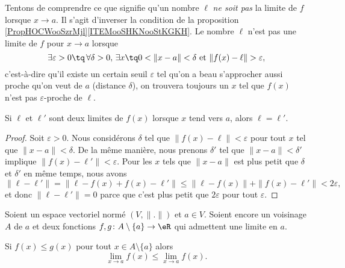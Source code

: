 Tentons de comprendre ce que signifie qu'un nombre $\ell$ \emph{ne soit pas} la limite de $f$ lorsque $x\to a$. Il s'agit d'inverser la condition de la proposition \ref{PropHOCWooSzrMjl}\ref{ITEMooSHKNooStKGKH}. Le nombre $\ell$ n'est pas une limite de $f$ pour $x\to a$ lorsque
\begin{equation}		\label{EqCaractNonLim}
	\exists\varepsilon>0\tq\,\forall\delta>0,\,\exists x\tq 0<\| x-a \|<\delta\text{ et }\| f(x)-\ell \|>\varepsilon,
\end{equation}
c'est-à-dire qu'il existe un certain seuil $\varepsilon$ tel qu'on a beau s'approcher aussi proche qu'on veut de $a$ (distance $\delta$), on trouvera toujours un $x$ tel que $f(x)$ n'est pas $\varepsilon$-proche de $\ell$.

\begin{lemma}
	Si $\ell$ et $\ell'$ sont deux limites de $f(x)$ lorsque $x$ tend vers $a$, alors $\ell=\ell'$.
\end{lemma}

\begin{proof}
	Soit $\varepsilon>0$. Nous considérons $\delta$ tel que $\| f(x)-\ell \|<\varepsilon$ pour tout $x$ tel que $\| x-a \|<\delta$. De la même manière, nous prenons $\delta'$ tel que $\| x-a \|<\delta'$ implique $\| f(x)-\ell' \|<\varepsilon$. Pour les $x$ tels que $\| x-a \|$ est plus petit que $\delta$ et $\delta'$ en même temps, nous avons
	\begin{equation}
		\| \ell-\ell' \|=\| \ell-f(x)+f(x)-\ell' \|\leq\| \ell-f(x) \|+\| f(x)-\ell' \|<2\varepsilon,
	\end{equation}
	et donc $\| \ell-\ell' \|=0$ parce que c'est plus petit que $2\varepsilon$ pour tout $\varepsilon$.
\end{proof}

\begin{proposition}  \label{PROPooKPOXooEHIXJs}
    Soient un espace vectoriel normé \( (V,\| . \|)\) et \( a\in V\). Soient encore un voisinage \( A\) de \( a\) et deux fonctions \( f,g\colon A\setminus \{ a \}\to \eR\) qui admettent une limite en \( a\). 

    Si \( f(x)\leq g(x)\) pour tout \( x\in A\setminus \{ a \}\) alors 
    \begin{equation}
        \lim_{x\to a} f(x)\leq \lim_{x\to a}f(x).
    \end{equation}
\end{proposition}


